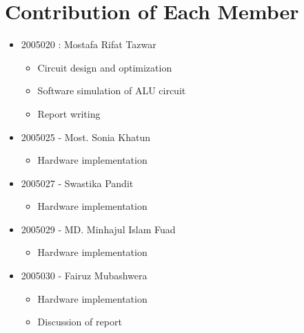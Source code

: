 \documentclass[18pt]{article}
\begin{document}
\section{Contribution of Each Member}
\begin{itemize}
    \item 2005020 : Mostafa Rifat Tazwar 
    \begin{itemize}
        \item Circuit design and optimization
        \item Software simulation of ALU circuit
        \item Report writing
    \end{itemize}
    \item 2005025 - Most. Sonia Khatun
    \begin{itemize}
        \item Hardware implementation
    \end{itemize}
    \item 2005027 - Swastika Pandit
    \begin{itemize}
        \item Hardware implementation
    \end{itemize}
    \item 2005029 - MD. Minhajul Islam Fuad
    \begin{itemize}
        \item Hardware implementation
    \end{itemize}
    \item 2005030 - Fairuz Mubashwera
    \begin{itemize}
        \item Hardware implementation
        \item Discussion of report
    \end{itemize}
\end{itemize}
\end{document}

